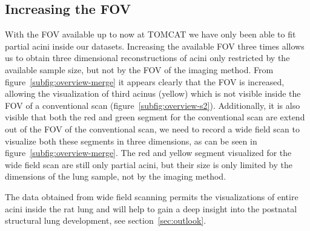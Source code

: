 \subsection{Increasing the FOV}

\cbstart
With the FOV available up to now at TOMCAT we have only been able to fit partial acini inside our datasets. Increasing the available FOV three times allows us to obtain three dimensional reconstructions of acini only restricted by the available sample size, but not by the FOV of the imaging method. From figure~\ref{subfig:overview-merge} it appears clearly that the FOV is increased, allowing the visualization of third acinus (yellow) which is not visible inside the FOV of a conventional scan (figure~\ref{subfig:overview-s2}). Additionally, it is also visible that both the red and green segment for the conventional scan are extend out of the FOV of the conventional scan, we need to record a wide field scan to visualize both these segments in three dimensions, as can be seen in figure~\ref{subfig:overview-merge}. The red and yellow segment visualized for the wide field scan are still only partial acini, but their size is only limited by the dimensions of the lung sample, not by the imaging method.

The data obtained from wide field scanning permits the visualizations of entire acini inside the rat lung and will help to gain a deep insight into the postnatal structural lung development, see section~\ref{sec:outlook}.
\cbend

